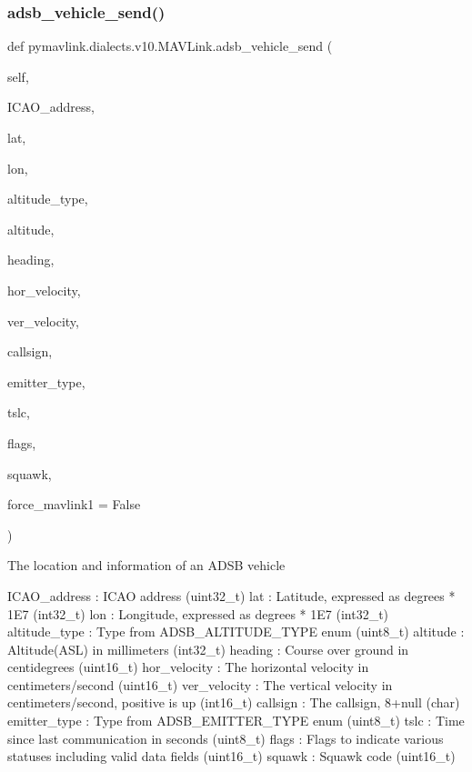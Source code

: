 \subsubsection{\texorpdfstring{adsb\+\_\+vehicle\+\_\+send()}{adsb\_vehicle\_send()}}
{\footnotesize\ttfamily def pymavlink.\+dialects.\+v10.\+M\+A\+V\+Link.\+adsb\+\_\+vehicle\+\_\+send (\begin{DoxyParamCaption}\item[{}]{self,  }\item[{}]{I\+C\+A\+O\+\_\+address,  }\item[{}]{lat,  }\item[{}]{lon,  }\item[{}]{altitude\+\_\+type,  }\item[{}]{altitude,  }\item[{}]{heading,  }\item[{}]{hor\+\_\+velocity,  }\item[{}]{ver\+\_\+velocity,  }\item[{}]{callsign,  }\item[{}]{emitter\+\_\+type,  }\item[{}]{tslc,  }\item[{}]{flags,  }\item[{}]{squawk,  }\item[{}]{force\+\_\+mavlink1 = {\ttfamily False} }\end{DoxyParamCaption})}

\begin{DoxyVerb}The location and information of an ADSB vehicle

ICAO_address              : ICAO address (uint32_t)
lat                       : Latitude, expressed as degrees * 1E7 (int32_t)
lon                       : Longitude, expressed as degrees * 1E7 (int32_t)
altitude_type             : Type from ADSB_ALTITUDE_TYPE enum (uint8_t)
altitude                  : Altitude(ASL) in millimeters (int32_t)
heading                   : Course over ground in centidegrees (uint16_t)
hor_velocity              : The horizontal velocity in centimeters/second (uint16_t)
ver_velocity              : The vertical velocity in centimeters/second, positive is up (int16_t)
callsign                  : The callsign, 8+null (char)
emitter_type              : Type from ADSB_EMITTER_TYPE enum (uint8_t)
tslc                      : Time since last communication in seconds (uint8_t)
flags                     : Flags to indicate various statuses including valid data fields (uint16_t)
squawk                    : Squawk code (uint16_t)\end{DoxyVerb}
 \mbox{\label{classpymavlink_1_1dialects_1_1v10_1_1MAVLink_ae5cd56ad2d47ba9a811c3b4eaac392b2}} 
